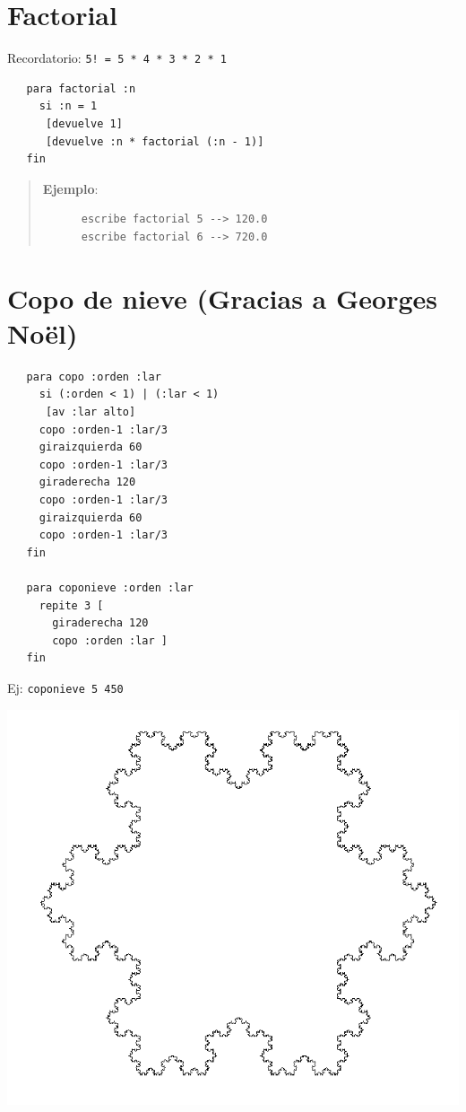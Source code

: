 \section{Factorial}
   \label{Factorial}

Recordatorio: \texttt{5! = 5 * 4 * 3 * 2 * 1}
\begin{verbatim}
   para factorial :n 
     si :n = 1 
      [devuelve 1]
      [devuelve :n * factorial (:n - 1)]
   fin \end{verbatim}
\begin{quote}
   \noindent \textbf{Ejemplo}:
   \begin{verbatim}
      escribe factorial 5 --> 120.0
      escribe factorial 6 --> 720.0 \end{verbatim}
\end{quote}

\section{Copo de nieve (Gracias a Georges No\"el)}
   \label{Copo-de-nieve}

\begin{verbatim}
   para copo :orden :lar
     si (:orden < 1) | (:lar < 1)
      [av :lar alto]
     copo :orden-1 :lar/3
     giraizquierda 60
     copo :orden-1 :lar/3
     giraderecha 120
     copo :orden-1 :lar/3
     giraizquierda 60
     copo :orden-1 :lar/3
   fin

   para coponieve :orden :lar 
     repite 3 [
       giraderecha 120 
       copo :orden :lar ]
   fin \end{verbatim}
Ej: \texttt{coponieve 5 450} 
\begin{center}
   \includegraphics[scale=0.4]{Imagenes/13_Ejemplos/CopoNieve.png}
\end{center}

